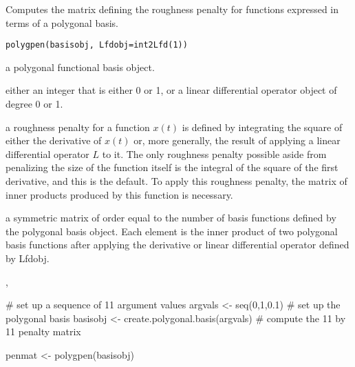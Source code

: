 \begin{Description}\relax
Computes the matrix defining the roughness penalty for functions
expressed in terms of a polygonal basis.
\end{Description}
\begin{Usage}
\begin{verbatim}
polygpen(basisobj, Lfdobj=int2Lfd(1))
\end{verbatim}
\end{Usage}
\begin{Arguments}
\begin{ldescription}
\item[\code{basisobj}] a polygonal functional basis object.

\item[\code{Lfdobj}] either an integer that is either 0 or 1, or a
linear differential operator object of degree 0 or 1.

\end{ldescription}
\end{Arguments}
\begin{Details}\relax
a roughness penalty for a function $ x(t) $ is defined by
integrating the square of either the derivative of  $ x(t) $ or,
more generally, the result of applying a linear differential operator
$ L $ to it.  The only roughness penalty possible aside from
penalizing the size of the function itself is the integral
of the square of the first derivative, and
this is the default. To apply this roughness penalty, the matrix of
inner products produced by this function is necessary.
\end{Details}
\begin{Value}
a symmetric matrix of order equal to the number of basis functions
defined by the polygonal basis object.  Each element is the inner product
of two polygonal basis functions after applying the derivative or linear
differential operator defined by Lfdobj.
\end{Value}
\begin{SeeAlso}\relax
{},
\end{SeeAlso}
\begin{Examples}
\begin{ExampleCode}

#  set up a sequence of 11 argument values
argvals <- seq(0,1,0.1)
#  set up the polygonal basis
basisobj <- create.polygonal.basis(argvals)
#  compute the 11 by 11 penalty matrix

penmat <- polygpen(basisobj)

\end{ExampleCode}
\end{Examples}

